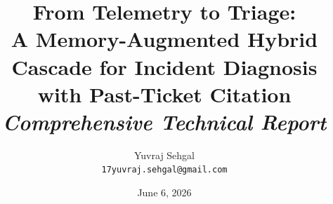 \documentclass[11pt,a4paper]{article}
\title{
  \Large\textbf{From Telemetry to Triage:}\\[2pt]
  \large A Memory-Augmented Hybrid Cascade for Incident Diagnosis with Past-Ticket Citation\\[6pt]
  \normalsize\textit{Comprehensive Technical Report}
}
\author{Yuvraj Sehgal\\\small\texttt{17yuvraj.sehgal@gmail.com}}
\date{June 6, 2026}
\begin{document}
\maketitle

\begin{abstract}

\end{abstract}

\tableofcontents
\vspace{1em}













\appendix





\end{document}
